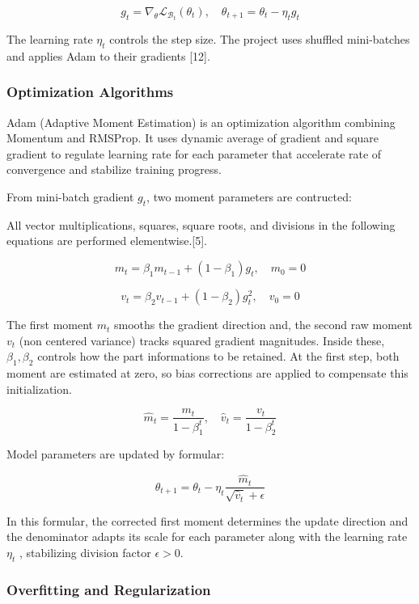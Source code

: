 \[
{g}_{t}={\nabla }_{\theta }{\mathcal{L}}_{{\mathcal{B}}_{t}}({\theta }_{t}),\quad {\theta }_{t+1}={\theta }_{t}-{\eta }_{t}{g}_{t}
\]

The learning rate \({\eta }_{t}\) controls the step size. The project uses shuffled mini-batches and applies Adam to their gradients [12].

\subsubsection{Optimization Algorithms}\label{theory:2.3.3}

Adam (Adaptive Moment Estimation) is an optimization algorithm combining Momentum and RMSProp. It uses dynamic average of gradient and square gradient to regulate learning rate for each parameter that accelerate rate of convergence and stabilize training progress.

From mini-batch gradient \({g}_{t}\), two moment parameters are contructed:

All vector multiplications, squares, square roots, and divisions in the following equations are performed elementwise.[5].

\[
{m}_{t}={\beta }_{1}{m}_{t-1}+(1-{\beta }_{1}){g}_{t},\quad {m}_{0}=0
\]

\[
{v}_{t}={\beta }_{2}{v}_{t-1}+(1-{\beta }_{2}){g}_{t}^{2},\quad {v}_{0}=0
\]

The first moment \({m}_{t}\) smooths the gradient direction and, the second raw moment \({v}_{t}\) (non centered variance) tracks squared gradient magnitudes. Inside these, \({\beta }_{1}, {\beta }_{2}\) controls how the part informations to be retained. At the first step, both moment are estimated at zero, so bias corrections are applied to compensate this initialization.

\[
{\hat{m}}_{t}=\frac{{m}_{t}}{1-{\beta }_{1}^{t}},\quad {\hat{v}}_{t}=\frac{{v}_{t}}{1-{\beta }_{2}^{t}}
\]

Model parameters are updated by formular:

\[
{\theta }_{t+1}={\theta }_{t}-{\eta }_{t}\frac{{\hat{m}}_{t}}{\sqrt{{\hat{v}}_{t}}+\epsilon }
\]

In this formular, the corrected first moment determines the update direction and the denominator adapts its scale for each parameter along with the learning rate \({\eta }_{t}\) , stabilizing division factor \(\epsilon >0\).

\subsubsection{Overfitting and Regularization}\label{theory:2.3.4}

